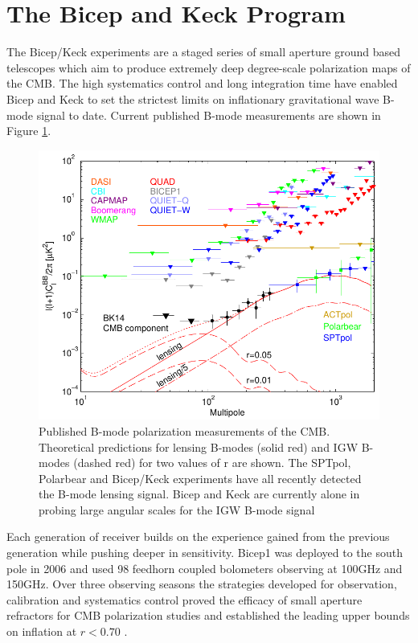 \documentclass[12pt]{article}
\begin{document}
\section{The Bicep and Keck Program}
The Bicep/Keck experiments are a staged series of small aperture ground based
telescopes which aim to produce extremely deep degree-scale polarization maps
of the CMB. The high systematics control and long integration time have
enabled Bicep and Keck to set the strictest limits on inflationary
gravitational wave B-mode signal to date. Current published B-mode
measurements are shown in Figure \ref{fig:BK_vs_world}.

\begin{figure}
	\center
	\includegraphics[width=.7\textwidth]{bk14_vs_world.pdf}
	\caption{Published B-mode polarization measurements of the CMB.
	Theoretical predictions for lensing B-modes (solid red) and IGW B-modes
	(dashed red) for two values of r are shown. The SPTpol, Polarbear and
	Bicep/Keck experiments have all recently detected the B-mode lensing
	signal. Bicep and Keck are currently alone in probing large
	angular scales for the IGW B-mode signal}
	\label{fig:BK_vs_world}
\end{figure}


Each generation of receiver builds on the experience gained from
the previous generation while pushing deeper in sensitivity.
Bicep1 was deployed to the south pole in 2006 and used 98 feedhorn coupled
bolometers observing at 100GHz and 150GHz. Over three observing seasons the
strategies developed for observation, calibration and systematics control
proved the efficacy of small aperture refractors for CMB polarization studies
and established the leading upper bounds on inflation at $r<0.70$
\cite{cite:Bicep1}.
\end{document}
